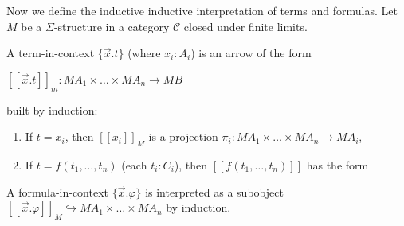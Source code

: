 \documentclass[a4paper]{article}
\theoremstyle{defin}
\theoremstyle{theorem}
\theoremstyle{claim}
\theoremstyle{prop}
\theoremstyle{lemma}
\theoremstyle{fact}
\theoremstyle{ex}
\theoremstyle{col}
\begin{document}
Now we define the inductive inductive interpretation of terms and formulas. Let $M$ be a $\Sigma$-structure in a category $\mathcal{C}$ closed under finite limits.

A term-in-context $\{ \vec{x}. t \}$ (where $x_i : A_i$) is an arrow of the form
\begin{center}
$[[\vec{x}. t]]_m : M A_1 \times \dots \times M A_n \to M B$
\end{center}
built by induction:
\begin{enumerate}
\item If $t = x_i$, then $[[x_i]]_M$ is a projection $\pi_i : M A_1 \times \dots \times M A_n \to M A_i$,
\item If $t = f(t_1, \dots, t_n)$ (each $t_i : C_i$), then $[[f(t_1, \dots, t_n)]]$ has the form

\centerline{
}
\end{enumerate}

A formula-in-context $\{ \vec{x}. \varphi \}$ is interpreted as a subobject $[[\vec{x}. \varphi]]_M \hookrightarrow M A_1 \times \dots \times M A_n$ by induction.
\end{document}
